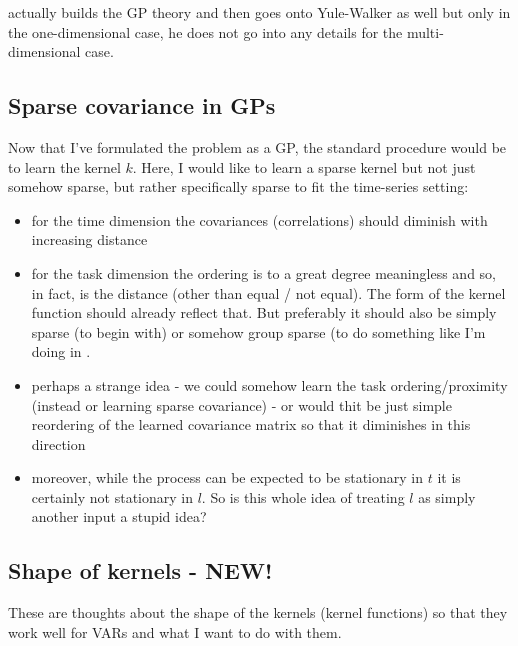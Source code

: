 \documentclass[a4paper]{article}
\begin{document}
\cite{Turner2012} actually builds the GP theory and then goes onto Yule-Walker as well but only in the one-dimensional case, he does not go into any details for the multi-dimensional case.

\subsection{Sparse covariance in GPs}
Now that I've formulated the problem as a GP, the standard procedure would be to learn the kernel $k$. 
Here, I would like to learn a sparse kernel but not just somehow sparse, but rather specifically sparse to fit the time-series setting:
\begin{itemize}
\item for the time dimension the covariances (correlations) should diminish with increasing distance
\item for the task dimension the ordering is to a great degree meaningless and so, in fact, is the distance (other than equal / not equal). The form of the kernel function should already reflect that. But preferably it should also be simply sparse (to begin with) or somehow group sparse (to do something like I'm doing in \cite{Gregorova2015}.
\item perhaps a strange idea - we could somehow learn the task ordering/proximity (instead or learning sparse covariance) - or would thit be just simple reordering of the learned covariance matrix so that it diminishes in this direction
\item moreover, while the process can be expected to be stationary in $t$ it is certainly not stationary in $l$. So is this whole idea of treating $l$ as simply another input a stupid idea?
\end{itemize}

\subsection{Shape of kernels - NEW!}
These are thoughts about the shape of the kernels (kernel functions) so that they work well for VARs and what I want to do with them.
\end{document}
